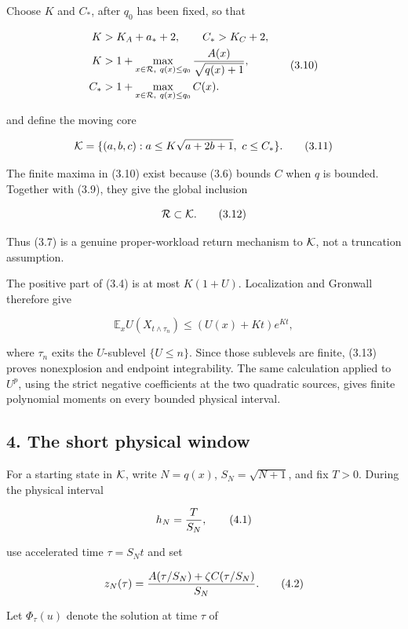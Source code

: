 Choose \(K\) and \(C_*\), after \(q_0\) has been fixed, so that

\[
\begin{split}
 K&>K_A+a_*+2,\qquad C_*>K_C+2,\\
 K&>1+\max_{x\in{\cal R},\ q(x)\le q_0}
          {A(x)\over\sqrt{q(x)+1}},\\
 C_*&>1+\max_{x\in{\cal R},\ q(x)\le q_0}C(x).
\end{split}                                                 \tag{3.10}
\]

and define the moving core

\[
 {\cal K}=\{(a,b,c):a\le K\sqrt{a+2b+1},\ c\le C_*\}.       \tag{3.11}
\]

The finite maxima in (3.10) exist because (3.6) bounds \(C\) when \(q\)
is bounded. Together with (3.9), they give the global inclusion

\[
 {\cal R}\subset{\cal K}.                                  \tag{3.12}
\]

Thus (3.7) is a genuine proper-workload return mechanism to
\({\cal K}\), not a truncation assumption.

The positive part of (3.4) is at most \(K(1+U)\). Localization and
Gronwall therefore give

\[
 \mathbb E_xU(X_{t\wedge\tau_n})
 \le (U(x)+K t)e^{Kt},                                     \tag{3.13}
\]

where \(\tau_n\) exits the \(U\)-sublevel \(\{U\le n\}\). Since those
sublevels are finite, (3.13) proves nonexplosion and endpoint
integrability. The same calculation applied to \(U^p\), using the strict
negative coefficients at the two quadratic sources, gives finite
polynomial moments on every bounded physical interval.

\subsection{4. The short physical
window}

For a starting state in \({\cal K}\), write \(N=q(x)\),
\(S_N=\sqrt{N+1}\), and fix \(T>0\). During the physical interval

\[
 h_N={T\over S_N},                                         \tag{4.1}
\]

use accelerated time \(\tau=S_Nt\) and set

\[
 z_N(\tau)={A(\tau/S_N)+\zeta C(\tau/S_N)\over S_N}.        \tag{4.2}
\]

Let \(\Phi_\tau(u)\) denote the solution at time \(\tau\) of

